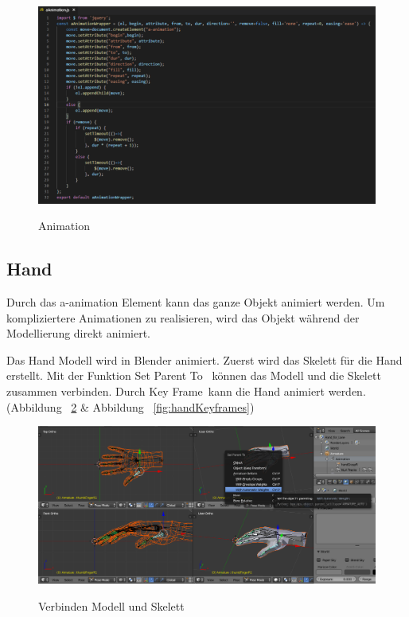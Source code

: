 \begin{figure}[ht]
\vspace*{1em}
\centering
\caption[Animation]{Animation}
\includegraphics[width=\textwidth]{images/aAnimation.png}
\label{fig:aAnimation} 
\end{figure}
 
 \subsection{Hand}
 
 Durch das {\selectfont a-animation} Element kann das ganze Objekt animiert werden. Um kompliziertere Animationen zu realisieren, wird das Objekt während der Modellierung direkt animiert.
 
 Das Hand Modell wird in Blender animiert. Zuerst wird das Skelett für die Hand erstellt. Mit der Funktion \glqq Set Parent To \grqq\ können das Modell und die Skelett zusammen verbinden. Durch \glqq Key Frame\grqq\ kann die Hand animiert werden. (Abbildung ~\ref{fig:handSetParentTo} \& Abbildung ~\ref{fig:handKeyframes})
 
\begin{figure}[ht]
\vspace*{1em}
\centering
\caption[Verbinden Modell und Skelett]{Verbinden Modell und Skelett}
\includegraphics[width=\textwidth]{images/handSetParentTo.png}
\label{fig:handSetParentTo} 
\end{figure}


